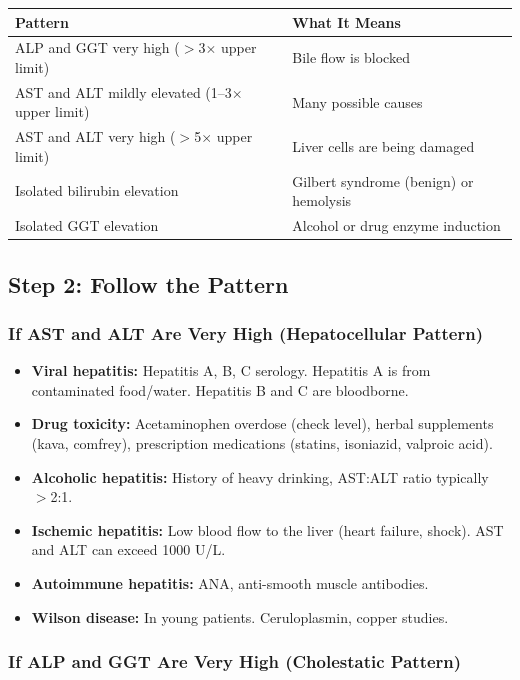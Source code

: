 \begin{longtable}{@{}ll@{}}
\toprule
\textbf{Pattern} & \textbf{What It Means} \\
\midrule
ALP and GGT very high ($>$3$\times$ upper limit) & Bile flow is blocked \\
AST and ALT mildly elevated (1--3$\times$ upper limit) & Many possible causes \\
AST and ALT very high ($>$5$\times$ upper limit) & Liver cells are being damaged \\
Isolated bilirubin elevation & Gilbert syndrome (benign) or hemolysis \\
Isolated GGT elevation & Alcohol or drug enzyme induction \\
\bottomrule
\end{longtable}

\subsection{Step 2: Follow the Pattern}

\subsubsection{If AST and ALT Are Very High (Hepatocellular Pattern)}

\begin{itemize}
    \item \textbf{Viral hepatitis:} Hepatitis A, B, C serology. Hepatitis A is from contaminated food/water. Hepatitis B and C are bloodborne.
    \item \textbf{Drug toxicity:} Acetaminophen overdose (check level), herbal supplements (kava, comfrey), prescription medications (statins, isoniazid, valproic acid).
    \item \textbf{Alcoholic hepatitis:} History of heavy drinking, AST:ALT ratio typically $>$2:1.
    \item \textbf{Ischemic hepatitis:} Low blood flow to the liver (heart failure, shock). AST and ALT can exceed 1000 U/L.
    \item \textbf{Autoimmune hepatitis:} ANA, anti-smooth muscle antibodies.
    \item \textbf{Wilson disease:} In young patients. Ceruloplasmin, copper studies.
\end{itemize}

\subsubsection{If ALP and GGT Are Very High (Cholestatic Pattern)}

